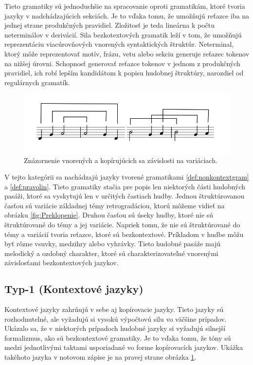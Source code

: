 Tieto gramatiky sú jednoduchšie na spracovanie oproti gramatikám, ktoré tvoria jazyky v nadchádzajúcich sekciách. Je to vďaka tomu, že umožňujú reťazce iba na jednej strane produkčných pravidiel. Zložitosť je teda lineárna k počtu neterminálov v derivácií. Sila bezkotextových gramatik leží v tom, že umožňujú reprezentáciu viacúrovňových vnorených syntaktických štruktúr. Neterminal, ktorý môže reprezentovať motív, frázu, vetu alebo sekciu generuje reťazec tokenov na nižšej úrovni. Schopnosť generovať reťazce tokenov v jednom z produkčných pravidiel, ich robí lepším kandidátom k popisu hudobnej štruktúry, narozdiel od regulárnych gramatík.

\begin{figure}[H]
    \centering
    \includegraphics[scale=0.4]{obrazky-figures/zavislosti.png}
    \caption{Znázornenie vnorených a kopírujúcich sa závislosti na variáciach.}
    \label{fig:dependencies}
\end{figure}

V tejto kategórii sa nachádzajú jazyky tvorené gramatikami \ref{def:nonkontextgram} a \ref{def:pravolin}. Tieto gramatiky stačia pre popis len niektorých části hudobných pasáži, ktoré sa vyskytujú len v určitých častiach hudby. Jednou štruktúrovanou časťou sú variácie základnej témy retrogradáciou, ktorú môžeme vidieť na obrázku \ref{fig:Preklopenie}. Druhou časťou sú úseky hudby, ktoré nie sú štruktúrované do témy a jej variácie. Napriek tomu, že nie sú štruktúrované do témy a variácií tvoria reťazce, ktoré sú bezkontextové. Príkladom v hudbe môžu byť rôzne vsuvky, medzihry alebo vyhrávky. Tieto hudobné pasáže majú melodický a ozdobný charakter, ktoré sú charakterizovateľné vnorenými závislosťami bezkontextových jazykov.

\subsection*{Typ-1 (Kontextové jazyky)}
Kontextové jazyky zahrňujú v sebe aj kopírovacie jazyky. Tieto jazyky sú rozhodnutelné, ale vyžadujú si vysokú výpočtovú silu vo väčšine prípadov. Ukázalo sa, že v niektorých prípadoch hudobné jazyky si vyžadujú silnejší formalizmus, ako sú bezkontextové gramatiky. Je to vďaka tomu, že tóny sú medzi jednotlivými taktami usporiadané vo forme kopírovacích jazykov. Ukážka takéhoto jazyka v notovom zápise je na pravej strane obrázka \ref{fig:dependencies}.

